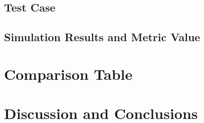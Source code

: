 \documentclass[12pt]{article}
\begin{document}
\newpage

\subsection{Test Case}



\newpage

\subsection{Simulation Results and Metric Value}



\newpage

\section{Comparison Table}



\newpage

\section{Discussion and Conclusions}
\end{document}
